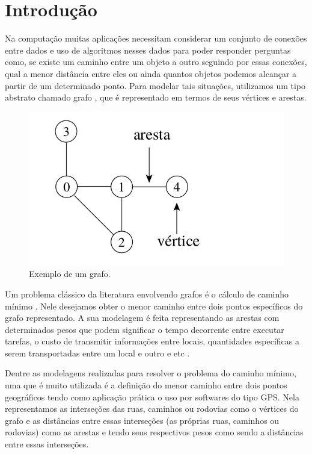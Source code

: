 \chapter{Introdução}
\label{sec-intro}
Na computação muitas aplicações necessitam considerar um conjunto de conexões entre dados e uso de algoritmos nesses dados para poder responder perguntas como, se existe um caminho entre um objeto a outro seguindo por essas conexões, qual a menor distância entre eles ou ainda quantos objetos podemos alcançar a partir de um determinado ponto. Para modelar tais situações, utilizamos um tipo abstrato chamado grafo \cite{ziviani2004projeto}, que é representado em termos de seus vértices e arestas.

\begin{figure}[H]
\centering
\includegraphics[width=.65\textwidth]{figuras/grafo-exemplo} 
\caption{Exemplo de um grafo.}
\label{fig-intro-exemplografo}
\end{figure}

Um problema clássico da literatura envolvendo grafos é o cálculo de caminho mínimo \cite{moura2010estudo}. Nele desejamos obter o menor caminho entre dois pontos específicos do grafo representado. A sua modelagem é feita representando as arestas com determinados pesos que podem significar o tempo decorrente entre executar tarefas, o custo de transmitir informações entre locais, quantidades específicas a serem transportadas entre um local e outro e etc \cite{drozdek2012data}. 

Dentre as modelagens realizadas para resolver o problema do caminho mínimo, uma que é muito utilizada é a definição do menor caminho entre dois pontos geográficos tendo como aplicação prática o uso por softwares do tipo GPS. Nela representamos as interseções das ruas, caminhos ou rodovias como o vértices do grafo e as distâncias entre essas interseções (as próprias ruas, caminhos ou rodovias) como as arestas e tendo seus respectivos pesos como sendo a distâncias entre essas interseções.

